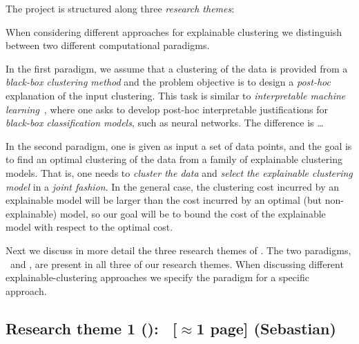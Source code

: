 \documentclass[a4paper,11pt]{article}
\begin{document}
The project is structured along three {\em research themes}:

\begin{description}
\setlength{\itemsep}{-2pt}
\item[\rto.~\newmodels\,:] 

\item[\rtw.~\clusterings\,:] 

\item[\rth.~\covariates\,:]
\end{description}

When considering different approaches for explainable clustering we distinguish between 
two different computational paradigms. 
\begin{description}
\setlength{\itemsep}{-2pt}
\item[\posthoc\,:]
In the first paradigm, we assume that a clustering of the data is provided 
from a \emph{black-box clustering method} and the problem objective is to design 
a \emph{post-hoc} explanation of the input clustering.
This task is similar to \emph{interpretable machine learning}~\cite{XXX}, 
where one asks to develop post-hoc interpretable justifications for 
\emph{black-box classification models}, such as neural networks. 
The difference is \ldots 
\item[\joint\,:]
In the second paradigm, one is given as input a set of data points, 
and the goal is to find an optimal clustering of the data
from a family of explainable clustering models.
That is, one needs to \emph{cluster the data} and \emph{select the explainable clustering model}
in a \emph{joint fashion}.
In the general case, the clustering cost incurred by an explainable model 
will be larger than the cost incurred by an optimal (but non-explainable) model, 
so our goal will be to bound the cost of the explainable model with respect to the optimal cost.
\end{description}

Next we discuss in more detail the three research themes of \acronym.
The two paradigms, \posthoc\ and \joint, are present in all three of our research themes.
When discussing different explainable-clustering approaches 
we specify the paradigm for a specific approach.

\subsection*{Research theme 1 (\rto): \newmodels\ {\color{orange}[$\approx$1 page]} {\color{teal}(Sebastian)}}
\end{document}
